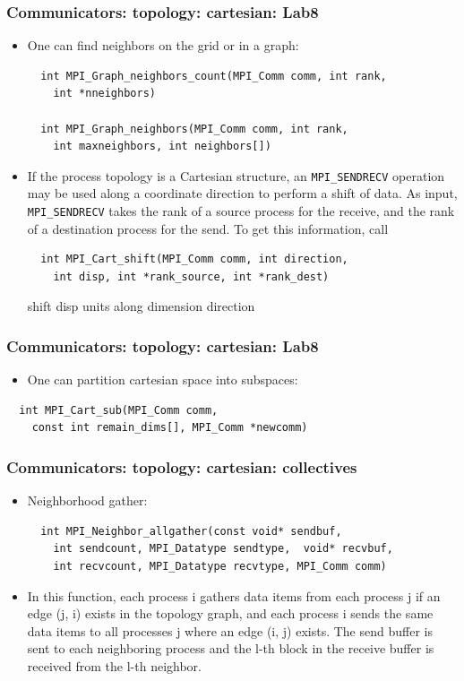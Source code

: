 \documentclass{beamer}
\begin{document}
\begin{frame}[fragile]
  \frametitle{Communicators: topology: cartesian: Lab8}
\begin{itemize}
\item One can find neighbors on the grid or in a graph:
{\color{mycolorcode}
\begin{verbatim}
  int MPI_Graph_neighbors_count(MPI_Comm comm, int rank, 
    int *nneighbors)

  int MPI_Graph_neighbors(MPI_Comm comm, int rank, 
    int maxneighbors, int neighbors[])
\end{verbatim}
}
\item If the process topology is a Cartesian structure, an {\color{mycolorcode}\verb|MPI_SENDRECV|} operation may be used
along a coordinate direction to perform a shift of data. As input, {\color{mycolorcode}\verb|MPI_SENDRECV|} takes
the rank of a source process for the receive, and the rank of a destination process for the
send. To get this information, call
{\color{mycolorcode}
\begin{verbatim}
  int MPI_Cart_shift(MPI_Comm comm, int direction, 
    int disp, int *rank_source, int *rank_dest)
\end{verbatim}
}
shift {\color{mycolorcode}disp} units along dimension {\color{mycolorcode}direction}
\end{itemize}
\end{frame}

\begin{frame}[fragile]
  \frametitle{Communicators: topology: cartesian: Lab8}
\begin{itemize}
\item One can partition cartesian space into subspaces:
\end{itemize}
{\color{mycolorcode}
\begin{verbatim}
  int MPI_Cart_sub(MPI_Comm comm, 
    const int remain_dims[], MPI_Comm *newcomm)
\end{verbatim}
}
\end{frame}

\begin{frame}[fragile]
  \frametitle{Communicators: topology: cartesian: collectives}
\begin{itemize}
\item Neighborhood gather:
{\color{mycolorcode}
\begin{verbatim}
  int MPI_Neighbor_allgather(const void* sendbuf, 
    int sendcount, MPI_Datatype sendtype,  void* recvbuf, 
    int recvcount, MPI_Datatype recvtype, MPI_Comm comm)
\end{verbatim}
}
\item In this function, each process i gathers data items from each process j if an edge (j, i) exists
in the topology graph, and each process i sends the same data items to all processes j where
an edge (i, j) exists. The send buffer is sent to each neighboring process and the l-th block
in the receive buffer is received from the l-th neighbor.
\end{itemize}
\end{frame}
\end{document}
